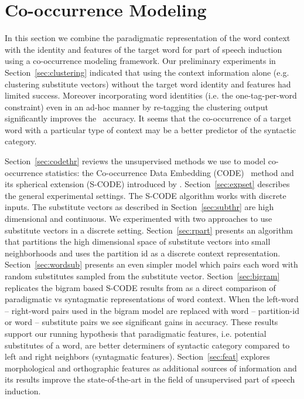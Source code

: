 \section{Co-occurrence Modeling}
\label{sec:code}

In this section we combine the paradigmatic representation of the word
context with the identity and features of the target word for part of
speech induction using a co-occurrence modeling framework.  Our
preliminary experiments in Section~\ref{sec:clustering} indicated that
using the context information alone (e.g. clustering substitute
vectors) without the target word identity and features had limited
success.  Moreover incorporating word identities (i.e. the
one-tag-per-word constraint) even in an ad-hoc manner by re-tagging
the clustering output significantly improves the \mto\ accuracy.  It
seems that the co-occurrence of a target word with a particular type
of context may be a better predictor of the syntactic category.

Section~\ref{sec:codethr} reviews the unsupervised methods we use to
model co-occurrence statistics: the Co-occurrence Data Embedding
(CODE)\ \cite{globerson2007euclidean} method and its spherical
extension (S-CODE) introduced by \cite{maron2010sphere}.
Section~\ref{sec:expset} describes the general experimental settings.
The S-CODE algorithm works with discrete inputs.  The substitute
vectors as described in Section~\ref{sec:subthr} are high dimensional
and continuous.  We experimented with two approaches to use substitute
vectors in a discrete setting.  Section~\ref{sec:rpart} presents an
algorithm that partitions the high dimensional space of substitute
vectors into small neighborhoods and uses the partition id as a
discrete context representation.  Section~\ref{sec:wordsub} presents
an even simpler model which pairs each word with random substitutes
sampled from the substitute vector.  Section~\ref{sec:bigram}
replicates the bigram based S-CODE results from \cite{maron2010sphere}
as a direct comparison of paradigmatic vs syntagmatic representations
of word context.  When the left-word -- right-word pairs used in the
bigram model are replaced with word -- partition-id or word --
substitute pairs we see significant gains in accuracy.  These results
support our running hypothesis that paradigmatic features,
i.e. potential substitutes of a word, are better determiners of
syntactic category compared to left and right neighbors (syntagmatic
features).  Section~\ref{sec:feat} explores morphological and
orthographic features as additional sources of information and its
results improve the state-of-the-art in the field of unsupervised
part of speech induction.

